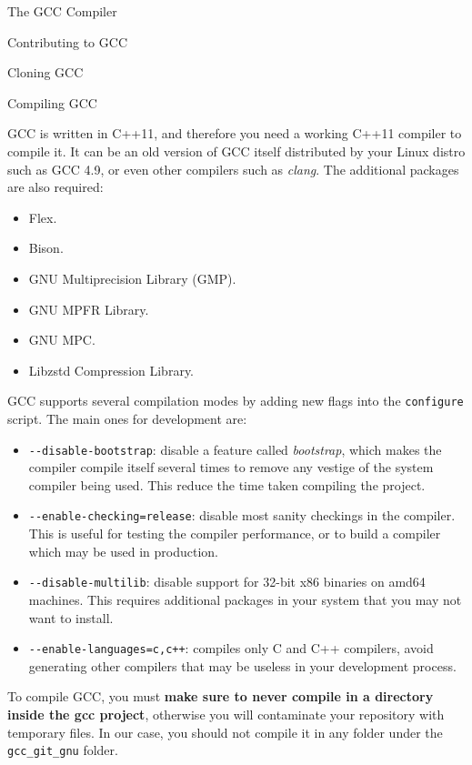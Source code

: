 \begin{section}{The GCC Compiler}
\begin{section}{Contributing to GCC}
\begin{subsection}{Cloning GCC}
\end{subsection}

\begin{subsection}{Compiling GCC}

GCC is written in C++11, and therefore you need a working C++11 compiler to
compile it. It can be an old version of GCC itself distributed by your Linux
distro such as GCC 4.9, or even other compilers such as \textit{clang}. The
additional packages are also required:
\begin{itemize}
	\item Flex.
	\item Bison.
	\item GNU Multiprecision Library (GMP).
	\item GNU MPFR Library.
	\item GNU MPC.
	\item Libzstd Compression Library.
\end{itemize}

GCC supports several compilation modes by adding new flags into the
\texttt{configure} script. The main ones for development are:
\begin{itemize}
	\item \texttt{-{}-disable-bootstrap}: disable a feature called \textit{bootstrap},
	which makes the compiler compile itself several times to remove any vestige
	of the system compiler being used. This reduce the time taken compiling the project.

	\item \texttt{-{}-enable-checking=release}: disable most sanity checkings in the
	compiler. This is useful for testing the compiler performance, or to build
	a compiler which may be used in production.

	\item \texttt{-{}-disable-multilib}: disable support for 32-bit x86 binaries on
	amd64 machines. This requires additional packages in your system that you may
	not want to install.

	\item \texttt{-{}-enable-languages=c,c++}: compiles only C and C++ compilers,
	avoid generating other compilers that may be useless in your development
	process.
\end{itemize}

To compile GCC, you must \textbf{make sure to never compile in a directory inside the
gcc project}, otherwise you will contaminate your repository with temporary files.
In our case, you should not compile it in any folder under the
\texttt{gcc\_git\_gnu} folder.


\end{subsection}
\end{section}
\end{section}

